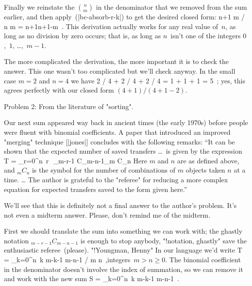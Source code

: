 {Finally we reinstate the $n \choose m$ in the denominator
that we removed from the sum earlier,
and then apply~\eq(|bc-absorb-r-k|)
to get the desired closed form:
\begindisplay
 {n+1 \choose m} \bigg/ {n \choose m}
	= {n+1\over n+1-m} \,.
\enddisplay
This derivation actually works for any real value of~$n$,
as long as no division by zero occurs;
that is, as long as $n$~isn't one of the integers $0$,~$1$, \dots,~$m-1$.

The more complicated the derivation,
the more important it is to check the answer.
This one wasn't too complicated but we'll check anyway.
In the small case $m=2$ and $n=4$ we have
\begindisplay
 {2 } \bigg/ {4 }
		\;+\; {2 } \bigg/ {4 }
		\;+\; {2 } \bigg/ {4 }
	= 1 + {1} + {1}
	= {5} \,;
\enddisplay
yes, this agrees perfectly with our closed form $(4+1)/(4+1-2)$.

\subhead Problem 2: From the literature of "sorting".

Our next sum appeared way back in ancient times (the early 1970s)
before people were fluent with binomial coefficients. A paper that
introduced an improved "merging" technique [|jones|] concludes with
the following remarks: ``It can be shown that the expected number
of saved transfers \dots\ is given by the expression
\begindisplay
 T = \sum_{r=0}^n \,r\,\, {_{m-r-1} C_{m-n-1}\over _m C_n}
\enddisplay
Here $m$ and $n$ are as defined above, and $_mC_n$ is the symbol for
the number of combinations of $m$ objects taken $n$ at a time. \dots\thinspace
The author is grateful to the "referee" for reducing a more complex equation
for expected transfers saved to the form given here.''

We'll see that this is definitely not a final answer to the author's
problem. It's not even a midterm answer.
\g Please, don't remind me of the midterm.\g

First we should translate the sum into something we can work with;
the ghastly notation $_{m-r-1} C_{m-n-1}$ is enough to stop anybody,
"!notation, ghastly"
save the enthusiastic referee~(please). "!Youngman, Henny" %
In our language we'd write
\begindisplay
 T = \sum_{k=0}^n\, k {m-k-1 \choose m-n-1} \bigg/
 {m \choose n} \,,\qquad\hbox{integers $m > n \geq 0$.}
\enddisplay
The binomial coefficient in the denominator
doesn't involve the index of summation,
so we can remove it and work with the new sum
\begindisplay
 S = \sum_{k=0}^n \,k {m-k-1 \choose m-n-1} \,.
\enddisplay

}
